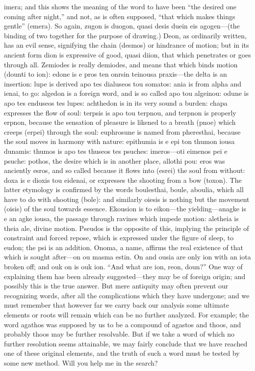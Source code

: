 \documentclass[11pt,letter]{article}
\begin{document}
imera; and this shows the meaning of the word to have been “the desired one coming after night,” and not, as is often supposed, “that which makes things gentle” (emera). So again, zugon is duogon, quasi desis duein eis agogen—(the binding of two together for the purpose of drawing.) Deon, as ordinarily written, has an evil sense, signifying the chain (desmos) or hindrance of motion; but in its ancient form dion is expressive of good, quasi diion, that which penetrates or goes through all. Zemiodes is really demiodes, and means that which binds motion (dounti to ion): edone is e pros ten onrsin teinousa praxis—the delta is an insertion: lupe is derived apo tes dialuseos tou somatos: ania is from alpha and ienai, to go: algedon is a foreign word, and is so called apo tou algeinou: odune is apo tes enduseos tes lupes: achthedon is in its very sound a burden: chapa expresses the flow of soul: terpsis is apo tou terpnou, and terpnon is properly erpnon, because the sensation of pleasure is likened to a breath (pnoe) which creeps (erpei) through the soul: euphrosune is named from pheresthai, because the soul moves in harmony with nature: epithumia is e epi ton thumon iousa dunamis: thumos is apo tes thuseos tes psuches: imeros—oti eimenos pei e psuche: pothos, the desire which is in another place, allothi pou: eros was anciently esros, and so called because it flows into (esrei) the soul from without: doxa is e dioxis tou eidenai, or expresses the shooting from a bow (toxon). The latter etymology is confirmed by the words boulesthai, boule, aboulia, which all have to do with shooting (bole): and similarly oiesis is nothing but the movement (oisis) of the soul towards essence. Ekousion is to eikon—the yielding—anagke is e an agke iousa, the passage through ravines which impede motion: aletheia is theia ale, divine motion. Pseudos is the opposite of this, implying the principle of constraint and forced repose, which is expressed under the figure of sleep, to eudon; the psi is an addition. Onoma, a name, affirms the real existence of that which is sought after—on ou masma estin. On and ousia are only ion with an iota broken off; and ouk on is ouk ion. “And what are ion, reon, doun?” One way of explaining them has been already suggested—they may be of foreign origin; and possibly this is the true answer. But mere antiquity may often prevent our recognizing words, after all the complications which they have undergone; and we must remember that however far we carry back our analysis some ultimate elements or roots will remain which can be no further analyzed. For example; the word agathos was supposed by us to be a compound of agastos and thoos, and probably thoos may be further resolvable. But if we take a word of which no further resolution seems attainable, we may fairly conclude that we have reached one of these original elements, and the truth of such a word must be tested by some new method. Will you help me in the search?
\end{document}
